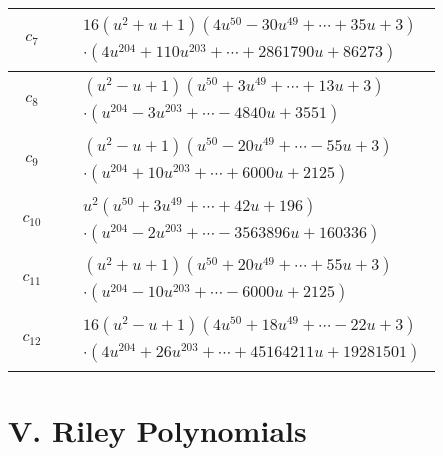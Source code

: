 \documentclass[1p]{elsarticle_modified}
\theoremstyle{definition}
\begin{document}
\begin{tabular}{m{50pt}|m{274pt}}
\hline $$\begin{aligned}c_{7}\end{aligned}$$&$\begin{aligned}
&16(u^2+u+1)(4 u^{50}-30 u^{49}+\cdots+35 u+3)\\
&\cdot(4 u^{204}+110 u^{203}+\cdots+2861790 u+86273)
\end{aligned}$\\
\hline $$\begin{aligned}c_{8}\end{aligned}$$&$\begin{aligned}
&(u^2- u+1)(u^{50}+3 u^{49}+\cdots+13 u+3)\\
&\cdot(u^{204}-3 u^{203}+\cdots-4840 u+3551)
\end{aligned}$\\
\hline $$\begin{aligned}c_{9}\end{aligned}$$&$\begin{aligned}
&(u^2- u+1)(u^{50}-20 u^{49}+\cdots-55 u+3)\\
&\cdot(u^{204}+10 u^{203}+\cdots+6000 u+2125)
\end{aligned}$\\
\hline $$\begin{aligned}c_{10}\end{aligned}$$&$\begin{aligned}
&u^2(u^{50}+3 u^{49}+\cdots+42 u+196)\\
&\cdot(u^{204}-2 u^{203}+\cdots-3563896 u+160336)
\end{aligned}$\\
\hline $$\begin{aligned}c_{11}\end{aligned}$$&$\begin{aligned}
&(u^2+u+1)(u^{50}+20 u^{49}+\cdots+55 u+3)\\
&\cdot(u^{204}-10 u^{203}+\cdots-6000 u+2125)
\end{aligned}$\\
\hline $$\begin{aligned}c_{12}\end{aligned}$$&$\begin{aligned}
&16(u^2- u+1)(4 u^{50}+18 u^{49}+\cdots-22 u+3)\\
&\cdot(4 u^{204}+26 u^{203}+\cdots+45164211 u+19281501)
\end{aligned}$\\
\hline
\end{tabular}\newpage\renewcommand{\arraystretch}{1}
\centering \section*{ V. Riley Polynomials}
\end{document}
